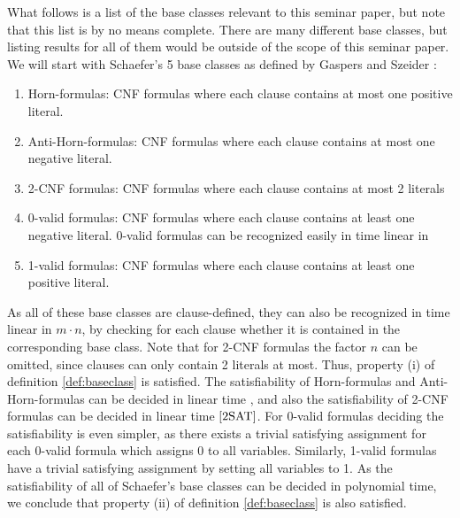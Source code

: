 \documentclass[11pt,a4paper]{article}
\theoremstyle{definition}
\theoremstyle{proposition}
\begin{document}
What follows is a list of the base classes relevant to this seminar paper, but note that this list is by no means complete. There are many different base classes, but listing results for all of them would be outside of the scope of this seminar paper. We will start with Schaefer's 5 base classes as defined by Gaspers and Szeider \cite[p.290f]{Gaspers2012}:
\begin{enumerate}
\item Horn-formulas: CNF formulas where each clause contains at most one positive literal. 
\item Anti-Horn-formulas: CNF formulas where each clause contains at most one negative literal. 
\item 2-CNF formulas: CNF formulas where each clause contains at most 2 literals
\item 0-valid formulas: CNF formulas where each clause contains at least one negative literal. 0-valid formulas can be recognized easily in time linear in 
\item 1-valid formulas: CNF formulas where each clause contains at least one positive literal. 
\end{enumerate}
As all of these base classes are clause-defined, they can also be recognized in time linear in $m \cdot n$, by checking for each clause whether it is contained in the corresponding base class. Note that for 2-CNF formulas the factor $n$ can be omitted, since clauses can only contain 2 literals at most. Thus, property (i) of definition \ref{def:baseclass} is satisfied. The satisfiability of Horn-formulas and Anti-Horn-formulas can be decided in linear time \cite{HornSAT}, and also the satisfiability of 2-CNF formulas can be decided in linear time $\cite{2SAT}$. For 0-valid formulas deciding the satisfiability is even simpler, as there exists a trivial satisfying assignment for each 0-valid formula which assigns 0 to all variables. Similarly, 1-valid formulas have a trivial satisfying assignment by setting all variables to 1. As the satisfiability of all of Schaefer's base classes can be decided in polynomial time, we conclude that property (ii) of definition \ref{def:baseclass} is also satisfied. 

\end{document}
